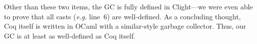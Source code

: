 Other than these two items, the GC is fully defined in Clight---we were even able to
prove that all casts (\emph{e.g.} {\color{black} line~6}) are well-defined.
As a concluding thought, Coq itself is written in OCaml with a similar-style garbage collector.
Thus, our GC is at least as well-defined as Coq itself.
